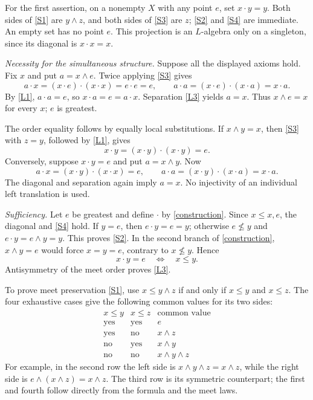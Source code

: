 \documentclass[11pt]{article}
\newcommand{\meet}{\wedge}
\newcommand{\dotop}{\mathbin{\cdot}}
\begin{document}
For the first assertion, on a nonempty \(X\) with any point \(e\), set
\(x\dotop y=y\). Both sides of \eqref{S1} are \(y\meet z\), and both sides of
\eqref{S3} are \(z\); \eqref{S2} and \eqref{S4} are immediate. An empty set
has no point \(e\). This projection is an \(L\)-algebra only on a singleton,
since its diagonal is \(x\dotop x=x\).

\medskip
\noindent\emph{Necessity for the simultaneous structure.}
Suppose all the displayed axioms hold. Fix \(x\) and put \(a=x\meet e\).
Twice applying \eqref{S3} gives
\[
a\dotop x=(x\dotop e)\dotop(x\dotop x)=e\dotop e=e,
\qquad
a\dotop a=(x\dotop e)\dotop(x\dotop a)=x\dotop a.
\]
By \eqref{L1}, \(a\dotop a=e\), so \(x\dotop a=e=a\dotop x\).
Separation \eqref{L3} yields \(a=x\). Thus \(x\meet e=x\) for every \(x\);
\(e\) is greatest.

The order equality follows by equally local substitutions. If \(x\meet y=x\),
then \eqref{S3} with \(z=y\), followed by \eqref{L1}, gives
\[
x\dotop y=(x\dotop y)\dotop(x\dotop y)=e.
\]
Conversely, suppose \(x\dotop y=e\) and put \(a=x\meet y\). Now
\[
a\dotop x=(x\dotop y)\dotop(x\dotop x)=e,
\qquad
a\dotop a=(x\dotop y)\dotop(x\dotop a)=x\dotop a.
\]
The diagonal and separation again imply \(a=x\). No injectivity of an
individual left translation is used.

\medskip
\noindent\emph{Sufficiency.}
Let \(e\) be greatest and define \(\dotop\) by \eqref{construction}.
Since \(x\leq x,e\), the diagonal and \eqref{S4} hold.
If \(y=e\), then \(e\dotop y=e=y\); otherwise \(e\not\leq y\) and
\(e\dotop y=e\meet y=y\). This proves \eqref{S2}.
In the second branch of \eqref{construction}, \(x\meet y=e\) would force
\(x=y=e\), contrary to \(x\not\leq y\). Hence
\[
x\dotop y=e\quad\Longleftrightarrow\quad x\leq y.
\]
Antisymmetry of the meet order proves \eqref{L3}.

To prove meet preservation \eqref{S1}, use
\(x\leq y\meet z\) if and only if \(x\leq y\) and \(x\leq z\).
The four exhaustive cases give the following common values for its two
sides:
\[
\begin{array}{c|c|c}
x\leq y&x\leq z&\text{common value}\\ \hline
\text{yes}&\text{yes}&e\\
\text{yes}&\text{no}&x\meet z\\
\text{no}&\text{yes}&x\meet y\\
\text{no}&\text{no}&x\meet y\meet z
\end{array}
\]
For example, in the second row the left side is
\(x\meet y\meet z=x\meet z\), while the right side is
\(e\meet(x\meet z)=x\meet z\). The third row is its symmetric counterpart;
the first and fourth follow directly from the formula and the meet laws.
\end{document}
